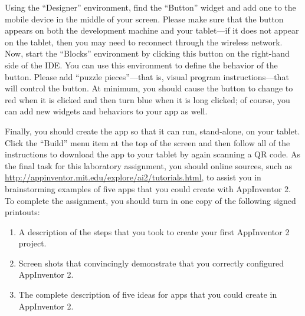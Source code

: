 Using the ``Designer'' environment, find the ``Button'' widget and add one to the mobile device in the middle of your
screen.  Please make sure that the button appears on both the development machine and your tablet---if it does not
appear on the tablet, then you may need to reconnect through the wireless network. Now, start the ``Blocks'' environment
by clicking this button on the right-hand side of the IDE. You can use this environment to define the behavior
of the button.  Please add ``puzzle pieces''---that is, visual program instructions---that will control the button. At
minimum, you should cause the button to change to red when it is clicked and then turn blue when it is long clicked; of
course, you can add new widgets and behaviors to your app as well.

Finally, you should create the app so that it can run, stand-alone, on your tablet. Click the ``Build'' menu item at the
top of the screen and then follow all of the instructions to download the app to your tablet by again scanning a QR
code.  As the final task for this laboratory assignment, you should online sources, such as
\url{http://appinventor.mit.edu/explore/ai2/tutorials.html}, to assist you in brainstorming examples of five apps that
you could create with AppInventor 2. To complete the assignment, you should turn in one copy of the following signed
printouts: 



\vspace*{-.1in}

\begin{enumerate}
	\itemsep0em
	\item A description of the steps that you took  to create your first AppInventor 2 project.
	\item Screen shots that convincingly demonstrate that you correctly configured AppInventor 2.
	\item The complete description of five ideas for apps that you could create in AppInventor 2.
\end{enumerate}

